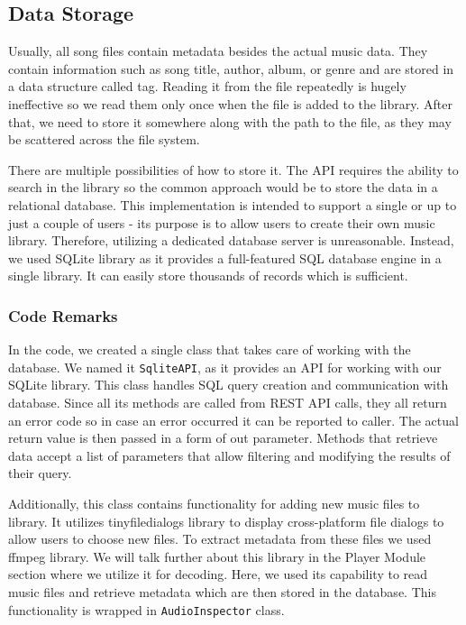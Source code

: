 \subsection{Data Storage}
Usually, all song files contain metadata besides the actual music data. They contain information such as song title, author, album, or genre and are stored in a data structure called tag. Reading it from the file repeatedly is hugely ineffective so we read them only once when the file is added to the library. After that, we need to store it somewhere along with the path to the file, as they may be scattered across the file system.
\par
There are multiple possibilities of how to store it. The API requires the ability to search in the library so the common approach would be to store the data in a relational database. This implementation is intended to support a single or up to just a couple of users - its purpose is to allow users to create their own music library. Therefore, utilizing a dedicated database server is unreasonable. Instead, we used SQLite library as it provides a full-featured SQL database engine in a single library. It can easily store thousands of records which is sufficient.

\subsubsection{Code Remarks}
In the code, we created a single class that takes care of working with the database. We named it \texttt{SqliteAPI}, as it provides an API for working with our SQLite library. This class handles SQL query creation and communication with database. Since all its methods are called from REST API calls, they all return an error code so in case an error occurred it can be reported to caller. The actual return value is then passed in a form of out parameter. Methods that retrieve data accept a list of parameters that allow filtering and modifying the results of their query.
\par
Additionally, this class contains functionality for adding new music files to library. It utilizes tinyfiledialogs library to display cross-platform file dialogs to allow users to choose new files. To extract metadata from these files we used ffmpeg library. We will talk further about this library in the Player Module section  where we utilize it for decoding. Here, we used its capability to read music files and retrieve metadata which are then stored in the database. This functionality is wrapped in \texttt{AudioInspector} class.

